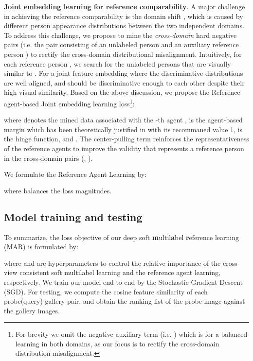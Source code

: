 \documentclass[10pt,twocolumn,letterpaper]{article}
\begin{document}
\vspace{0.1cm}
\noindent
\textbf{Joint embedding learning for reference comparability}.
A major challenge in achieving the reference comparability is the domain shift \cite{2010_TKDE_survey},
which is caused by different person appearance distributions
between the two independent domains.
To address this challenge,
we propose to mine the \emph{cross-domain} hard negative pairs
(i.e. the pair consisting of an unlabeled person  and an auxiliary reference person )
to rectify the cross-domain distributional misalignment.
Intuitively, for each reference person ,
we search for the unlabeled persons 
that are visually similar to .
For a joint feature embedding where the discriminative distributions are well aligned,
 and  should be discriminative enough to each other despite their high visual similarity.
Based on the above discussion, we propose the Reference agent-based Joint embedding learning loss\footnote{For brevity
we omit the negative auxiliary term (i.e. ) which is for a balanced learning in both domains,
as our focus is to rectify the cross-domain distribution misalignment.}:
{\small

}where  denotes the mined data associated with the -th agent ,
 is the agent-based margin which has been theoretically justified in \cite{2017_ACMMM_normface}
with its recommaned value 1,
 is the hinge function,
and
.
The center-pulling term  reinforces the representativeness of the reference agents
to improve the validity that  represents a reference person in the cross-domain pairs (, ).


We formulate the Reference Agent Learning by:
{\small

}where  balances the loss magnitudes.

\subsection{Model training and testing}
To summarize, the loss objective of our deep soft \textbf{m}ultil\textbf{a}bel \textbf{r}eference learning (MAR)
is formulated by:
{\small

}where  and  are hyperparameters to control the relative importance of the cross-view consistent soft multilabel learning
and the reference agent learning, respectively.
We train our model end to end by the Stochastic Gradient Descent (SGD).
For testing, we compute the cosine feature similarity of each probe(query)-gallery pair,
and obtain the ranking list of the probe image against the gallery images.
\end{document}
